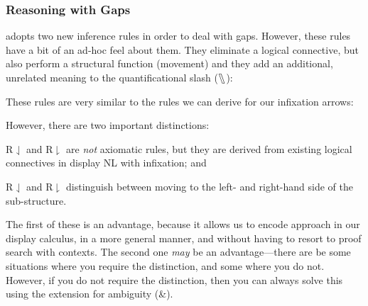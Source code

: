 


\subsubsection{Reasoning with Gaps}
\citet[][chapter 17.10]{barker2015} adopts two new inference rules in
order to deal with gaps. However, these rules have a bit of an ad-hoc
feel about them. They eliminate a logical connective, but also
perform a structural function (movement) and they add an additional,
unrelated meaning to the quantificational slash ($\fatbslash$):
\begin{center}
  \begin{pfbox}
  \end{pfbox}
  \begin{pfbox}
  \end{pfbox}
\end{center}
These rules are very similar to the rules we can derive for our
infixation arrows:
\begin{center}
  \begin{pfbox}
  \end{pfbox}
  \begin{pfbox}
  \end{pfbox}
\end{center}
However, there are two important distinctions:
\begin{enumerate*}[label=(\arabic*)]
\item R${\downharpoonleft}$ and R${\downharpoonright}$ are \emph{not}
  axiomatic rules, but they are derived from existing logical
  connectives in display NL with infixation; and
\item R${\downharpoonleft}$ and R${\downharpoonright}$ distinguish
  between moving to the left- and right-hand side of the
  sub-structure.
\end{enumerate*}
The first of these is an advantage, because it allows us to encode
 approach in our display calculus, in a more
general manner, and without having to resort to proof search with
contexts. The second one \emph{may} be an advantage---there are be
some situations where you require the distinction, and some where you
do not. However, if you do not require the distinction, then you can
always solve this using the extension for ambiguity (\&).





